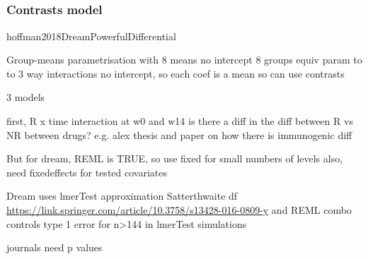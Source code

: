 \begin{outline}
\subsection{}

\subsubsection{Contrasts model}

 hoffman2018DreamPowerfulDifferential

Group-means parametrisation with 8 means
    no intercept 8 groups equiv param to to 3 way interactions
    no intercept, so each coef is a mean
so can use contrasts

3 models

first, R x time interaction at w0 and w14
is there a diff in the diff between R vs NR between drugs?
e.g. alex thesis and paper on how there is immunogenic diff

But for dream, 
REML is TRUE, so use fixed for small numbers of levels
also, need fixedeffects for tested covariates

Dream uses lmerTest approximation Satterthwaite df \url{https://link.springer.com/article/10.3758/s13428-016-0809-y} and REML
combo controls type 1 error for n>144 in lmerTest simulations

journals need p values
%


\end{outline}
